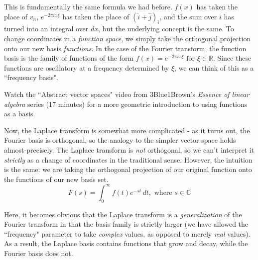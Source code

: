This is fundamentally the same formula we had before. $f(x)$ has taken the place
of $v_n$, $e^{-2\pi ix \xi}$ has taken the place of $(\hat{i} + \hat{j})_i$, and
the sum over $i$ has turned into an integral over $dx$, but the underlying
concept is the same. To change coordinates in a \textit{function space}, we
simply take the orthogonal projection onto our new basis \textit{functions}. In
the case of the Fourier transform, the function basis is the family of functions
of the form $f(x) = e^{-2\pi ix \xi} \text{ for } \xi \in \mathbb{R}$. Since
these functions are oscillatory at a frequency determined by $\xi$, we can think
of this as a ``frequency basis".
\begin{remark}
  Watch the ``Abstract vector spaces" video from 3Blue1Brown's \textit{Essence
  of linear algebra} series (17 minutes)
  \cite{bib:linalg_abstract_vector_spaces} for a more geometric introduction to
  using functions as a basis.
\end{remark}

Now, the Laplace transform is somewhat more complicated - as it turns out, the
Fourier basis is orthogonal, so the analogy to the simpler vector space holds
almost-precisely. The Laplace transform is \textit{not} orthogonal, so we can't
interpret it \textit{strictly} as a change of coordinates in the traditional
sense. However, the intuition is the same: we are taking the orthogonal
projection of our original function onto the functions of our new basis set.
\begin{equation*}
  F(s) = \int_0^\infty f(t) e^{-st} \,dt, \text{ where } s \in \mathbb{C}
\end{equation*}

Here, it becomes obvious that the Laplace transform is a \textit{generalization}
of the Fourier transform in that the basis family is strictly larger (we have
allowed the ``frequency" parameter to take \textit{complex} values, as opposed
to merely \textit{real} values). As a result, the Laplace basis contains
functions that grow and decay, while the Fourier basis does not.
